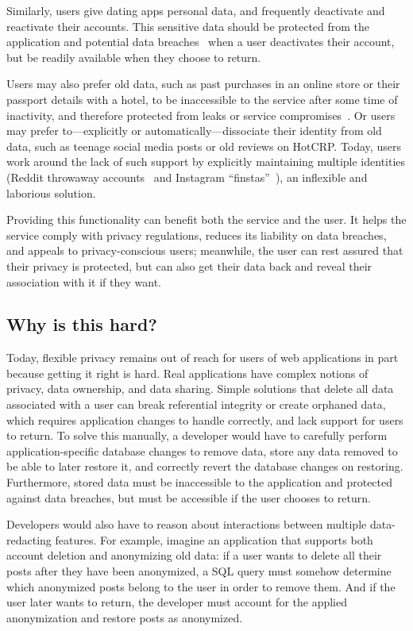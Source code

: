 Similarly, users give dating apps personal data, and frequently deactivate and
reactivate their accounts.
%
This sensitive data should be protected from the application and potential data
breaches~\cite{tinder, okcupid} when a user deactivates their account, but be
readily available when they choose to return.

Users may also prefer old data, such as past purchases in an online store or
their passport details with a hotel, to be inaccessible to the service after
some time of inactivity, and therefore protected from leaks or service
compromises~\cite{retention,breach:marriott}. Or users may prefer
to---explicitly or automatically---dissociate their identity from old data, such
as teenage social media posts or old reviews on HotCRP.
%
Today, users work around the lack of such support by explicitly maintaining
multiple identities (\eg Reddit throwaway
accounts~\cite{reddit:throwaway} and Instagram
``finstas''~\cite{nytimes:finsta}), an inflexible and laborious solution.
%

%
Providing this functionality can benefit both the service and the user.
%
It helps the service comply with privacy regulations, reduces its liability on
data breaches, and appeals to privacy-conscious users; meanwhile, the user can
rest assured that their privacy is protected, but can also get their data back
and reveal their association with it if they want.
%

\subsection{Why is this hard?} 
Today, flexible privacy remains out of reach for users of
web applications in part because getting it right is hard. 
%
Real applications have complex notions of privacy, data ownership, and data
sharing.
%
Simple solutions that \eg delete all data associated with a user can break
referential integrity or create orphaned data, which requires application
changes to handle correctly, and lack support for users to return.
%
To solve this manually, a developer would have to carefully perform
application-specific database changes to remove data, store any data removed to
be able to later restore it, and correctly revert the database changes on
restoring.
%
Furthermore, stored data must be inaccessible to the application and protected
against data breaches, but must be accessible if the user chooses to return.
%

Developers would also have to reason about interactions between multiple
data-redacting features.
%
For example, imagine an application that supports both account deletion and
anonymizing old data: if a user wants to delete all their posts after they have
been anonymized, a SQL query must somehow determine which anonymized posts
belong to the user in order to remove them.
%
And if the user later wants to return, the developer must account for the
applied anonymization and restore posts as anonymized.
%
